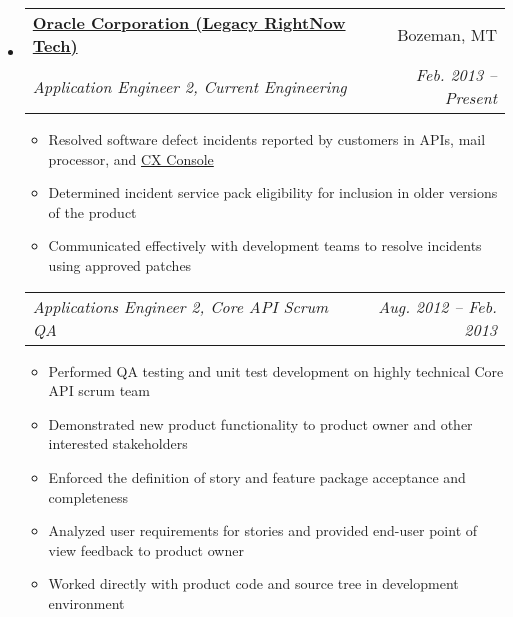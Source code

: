 \documentclass[letterpaper,11pt]{article}
\makeatletter
\newcommand{\resitem}[1]{\item #1 \vspace{-2pt}}
\newcommand{\ressubheading}[4]{
\begin{tabular*}{6.5in}{l@{\extracolsep{\fill}}r}
		\textbf{#1} & #2 \\
		\textit{#3} & \textit{#4} \\
\end{tabular*}\vspace{-6pt}}
\newcommand{\ressubsubheading}[2]{
\begin{tabular*}{6.5in}{l@{\extracolsep{\fill}}r}
		\textit{#1} & \textit{#2} \\
\end{tabular*}\vspace{-6pt}}
\makeatother
\begin{document}
	\begin{itemize}
		\item 
			\ressubheading{\href{http://www.oracle.com}{Oracle Corporation (Legacy RightNow Tech)}}{Bozeman, MT}
				{Application Engineer 2, Current Engineering}{Feb. 2013 -- Present}
				{ \footnotesize
				\begin{itemize}
					\resitem{Resolved software defect incidents reported by customers in APIs, mail processor, and \href{http://www.oracle.com/us/solutions/customer-experience/oracle-customer-experience/overview/index.html}{CX Console}}
					\resitem{Determined incident service pack eligibility for inclusion in older versions of the product}
					\resitem{Communicated effectively with development teams to resolve incidents using approved patches}
				\end{itemize}
				}

			\ressubsubheading{Applications Engineer 2, Core API Scrum QA}{Aug. 2012 -- Feb. 2013}
				{ \footnotesize
				\begin{itemize}
					\resitem{Performed QA testing and unit test development on highly technical Core API scrum team}
					\resitem{Demonstrated new product functionality to product owner and other interested stakeholders}
					\resitem{Enforced the definition of story and feature package acceptance and completeness}
					\resitem{Analyzed user requirements for stories and provided end-user point of view feedback to product owner}
                                        \resitem{Worked directly with product code and source tree in development environment}
				\end{itemize}
				}


\end{itemize}
\end{document}
